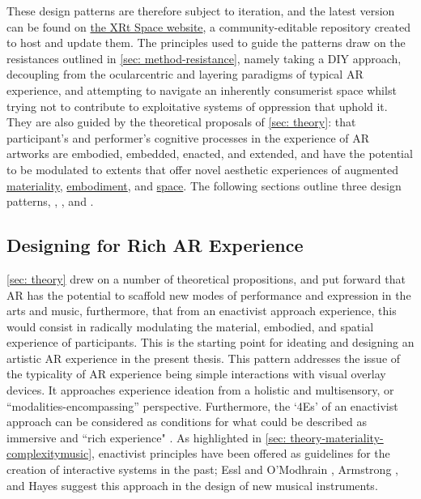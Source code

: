 These design patterns are therefore subject to iteration, and the latest version can be found on \href{https://www.thexrt.space}{the XRt Space website}, a community-editable repository created to host and update them. The principles used to guide the patterns draw on the resistances outlined in \autoref{sec: method-resistance}, namely taking a DIY approach, decoupling from the ocularcentric and layering paradigms of typical AR experience, and attempting to navigate an inherently consumerist space whilst trying not to contribute to exploitative systems of oppression that uphold it. They are also guided by the theoretical proposals of \autoref{sec: theory}: that participant's and performer's cognitive processes in the experience of AR artworks are embodied, embedded, enacted, and extended, and have the potential to be modulated to extents that offer novel aesthetic experiences of augmented \hyperref[sec: theory-materiality]{materiality}, \hyperref[sec: theory-embodiment]{embodiment}, and \hyperref[sec: theory-space]{space}. The following sections outline three design patterns, \textit{}, \textit{}, and \textit{}.

\subsection{Designing for Rich AR Experience} \label{sec: method-patterns-experience} 
\autoref{sec: theory} drew on a number of theoretical propositions, and put forward that AR has the potential to scaffold new modes of performance and expression in the arts and music, furthermore, that from an enactivist approach experience, this would consist in radically modulating the material, embodied, and spatial experience of participants. This is the starting point for ideating and designing an artistic AR experience in the present thesis. This pattern addresses the issue of the typicality of AR experience being simple interactions with visual overlay devices. It approaches experience ideation from a holistic and multisensory, or ``modalities-encompassing'' \citep{schraffenberger2018} perspective. Furthermore, the `4Es' of an enactivist approach can be considered as conditions for what could be described as immersive and ``rich experience" \citep{bilbow2021}. As highlighted in \autoref{sec: theory-materiality-complexitymusic}, enactivist principles have been offered as guidelines for the creation of interactive systems in the past; Essl and O'Modhrain \citeyearpar{essl2006}, Armstrong \citeyearpar{armstrong2006}, and Hayes \citeyearpar{hayes2019} suggest this approach in the design of new musical instruments. 

